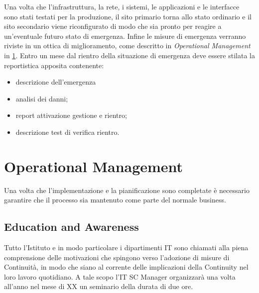 Una volta che l'infrastruttura, la rete, i sistemi, le applicazioni e le interfacce sono stati testati per la produzione, il sito primario torna allo stato ordinario e il sito secondario viene riconfigurato di modo che sia pronto per reagire a un'eventuale futuro stato di emergenza. Infine le misure di emergenza verranno riviste in un ottica di miglioramento, come descritto in \textit{Operational Management} in \ref{opmgmt}. Entro un mese dal rientro della situazione di emergenza deve essere stilata la reportistica apposita contenente:
\begin{itemize}
\item descrizione dell'emergenza
\item analisi dei danni;
\item report attivazione gestione e rientro;
\item descrizione test di verifica rientro.
\end{itemize}















































\newpage
\section{Operational Management}
\label{opmgmt}
Una volta che l'implementazione e la pianificazione sono completate è necessario garantire che il processo sia mantenuto come parte del normale business.
\subsection{Education and Awareness} Tutto l'Istituto e in modo particolare i dipartimenti IT sono chiamati alla piena comprensione delle motivazioni che spingono verso l'adozione di misure di Continuità, in modo che siano al corrente delle implicazioni della Continuity nel loro lavoro quotidiano.
A tale scopo l'IT SC Manager organizzarà una volta all'anno nel mese di XX un seminario della durata di due ore.

